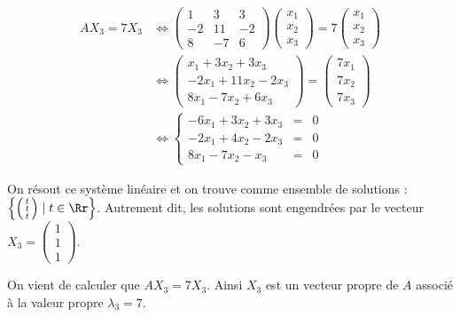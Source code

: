 \documentclass[11pt, class=report,crop=false]{standalone}
\begin{document}
\begin{exemple}
\begin{itemize}
  \begin{align*}
  AX_3 = 7 X_3 
    & \iff  \begin{pmatrix}
1 & 3 & 3 \\
-2 & 11 & -2 \\
8 & -7 & 6
\end{pmatrix} 
\begin{pmatrix}x_1\\x_2\\x_3\end{pmatrix}
= 7\begin{pmatrix}x_1\\x_2\\x_3\end{pmatrix} \\
    & \iff  
\begin{pmatrix}
x_1 + 3x_2 + 3x_3 \\
-2x_1 + 11x_2  -2x_3 \\
8x_1 -7x_2 + 6x_3\end{pmatrix}
= \begin{pmatrix}7x_1\\7x_2\\7x_3\end{pmatrix} \\
& \iff  
\left\{ 
\begin{array}{rcl}
-6x_1 + 3x_2 + 3x_3 &=& 0\\
-2x_1 + 4x_2 - 2x_3 &=& 0\\
8x_1 -7x_2 - x_3 &=& 0
\end{array}
\right.
\end{align*}

On résout ce système linéaire et on trouve comme ensemble de solutions :
$\left\{ 
\left(\begin{smallmatrix} t \\ t \\ t \end{smallmatrix}\right) \mid t \in \Rr
\right\}$.
Autrement dit, les solutions sont engendrées par le vecteur 
$X_3 = \begin{pmatrix}1\\1\\1\end{pmatrix}$.

On vient de calculer que $AX_3 = 7X_3$.
Ainsi $X_3$ est un vecteur propre de $A$ associé à la valeur propre $\lambda_3 = 7$.
\end{itemize}  
\end{exemple}
  
\end{document}
